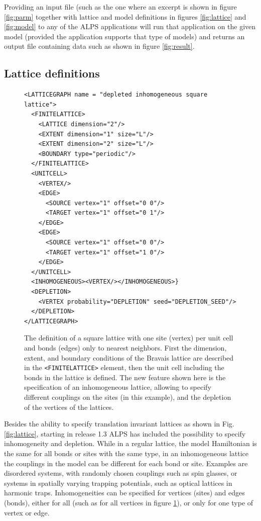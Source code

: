 \documentclass[12pt]{iopart}
\begin{document}
Providing an input file (such as the one where an excerpt is shown in figure \ref{fig:parm} together with lattice and model definitions in figures  \ref{fig:lattice} and \ref{fig:model} to any of the ALPS applications will run that application on the given model (provided the application supports that type of models) and returns an output file containing data such as shown in figure \ref{fig:result}. 

\subsection{Lattice definitions}

\begin{figure}
\begin{lstlisting}
<LATTICEGRAPH name = "depleted inhomogeneous square lattice">
  <FINITELATTICE>
    <LATTICE dimension="2"/>  
    <EXTENT dimension="1" size="L"/>
    <EXTENT dimension="2" size="L"/>
    <BOUNDARY type="periodic"/>  
  </FINITELATTICE>
  <UNITCELL>
    <VERTEX/>
    <EDGE>
      <SOURCE vertex="1" offset="0 0"/>
      <TARGET vertex="1" offset="0 1"/>
    </EDGE>
    <EDGE>
      <SOURCE vertex="1" offset="0 0"/>
      <TARGET vertex="1" offset="1 0"/>
    </EDGE>
  </UNITCELL> 
  <INHOMOGENEOUS><VERTEX/></INHOMOGENEOUS>}
  <DEPLETION>
    <VERTEX probability="DEPLETION" seed="DEPLETION_SEED"/>
  </DEPLETION>
</LATTICEGRAPH>
\end{lstlisting}

\caption{The definition of a square lattice with one site (vertex) per
unit cell and bonds (edges) only to nearest neighbors. First the
dimension, extent, and boundary conditions of the Bravais lattice are
described in the {\tt <FINITELATTICE>} element, then the unit cell
including the bonds in the lattice is defined. The new feature shown here is the specification of an inhomogeneous lattice, allowing to specify different couplings on the sites (in this example), and the depletion of the vertices of the lattices.}
\label{fig:deplattice}
\end{figure}
Besides the ability to specify translation invariant lattices as shown in Fig. \ref{fig:lattice}, starting in release 1.3 ALPS has included the possibility to specify inhomogeneity and depletion. While in a regular lattice, the model Hamiltonian is the same for all bonds or sites with the same type, in an inhomogeneous lattice the couplings in the model can be different for each bond or site. Examples are disordered systems, with randomly chosen couplings such as spin glasses, or systems in spatially varying trapping potentials, such as optical lattices in harmonic traps.
Inhomogeneities can be specified for vertices (sites) and edges (bonds), either for all (such as for all vertices in figure \ref{fig:deplattice}), or only for one type of vertex or edge. 
\end{document}
